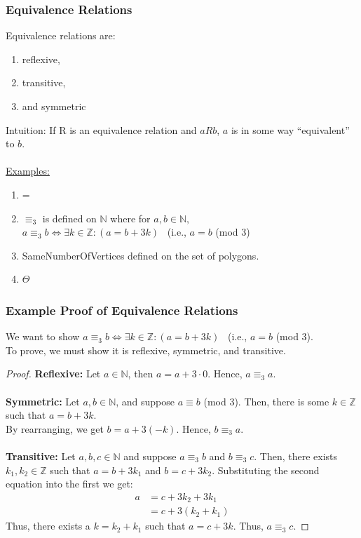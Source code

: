 \documentclass{article}
\begin{document}
\subsubsection{Equivalence Relations}
Equivalence relations are:
\begin{enumerate}
    \item reflexive,
    \item transitive,
    \item and symmetric
\end{enumerate}
Intuition: If R is an equivalence relation and $aRb$, $a$ is in some way ``equivalent'' to $b$.
\\
\\
\underline{Examples:}
\begin{enumerate}
    \item =
    \item $\equiv_3$ is defined on $\mathbb{N}$ where for $a,b \in \mathbb{N},$\\
    $a \equiv_3 b \iff \exists k \in \mathbb{Z} : (a = b + 3k)$ \ (i.e., $a = b$ (mod 3)
    \item SameNumberOfVertices defined on the set of polygons.
    \item $\Theta$
\end{enumerate}

\subsubsection{Example Proof of Equivalence Relations}
We want to show $a \equiv_3 b \iff \exists k \in \mathbb{Z} : (a = b + 3k)$ \ (i.e., $a = b$ (mod 3).\\
To prove, we must show it is reflexive, symmetric, and transitive.
\begin{proof}
\textbf{Reflexive: }Let $a \in \mathbb{N}$, then $a = a + 3 \cdot 0$. Hence, $a \equiv_3 a$.\\
\\
\textbf{Symmetric: }Let $a, b \in \mathbb{N}$, and suppose $a \equiv b$ (mod 3). Then, there is some $k \in \mathbb{Z}$ such that $a = b + 3k$.\\
By rearranging, we get $b = a + 3(-k)$. Hence, $b \equiv_3 a$.\\
\\
\textbf{Transitive: }Let $a,b,c \in \mathbb{N}$ and suppose $a \equiv_3 b$ and $b \equiv_3 c$. Then, there exists $k_1, k_2 \in \mathbb{Z}$ such that $a = b + 3k_1$ and $b = c + 3k_2$. Substituting the second equation into the first we get:
\begin{align*}
    a & = c + 3k_2 + 3k_1\\
    & = c + 3(k_2 + k_1)
\end{align*}
Thus, there exists a $k = k_2 + k_1$ such that $a = c + 3k$. Thus, $a \equiv_3 c$. 
\end{proof}
\end{document}
